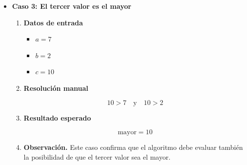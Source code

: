 \documentclass[12pt,twoside]{book}
\begin{document}
\begin{itemize}
\begin{enumerate}
								\item \textbf{Resolución manual}
								
								\[
								9 > 4 \quad \text{y} \quad 9 > 6
								\]
								
								\item \textbf{Resultado esperado}
								
								\[
								\text{mayor} = 9
								\]
								
								\item \textbf{Observación.}  
								Permite comprobar que el algoritmo puede identificar correctamente cuando el segundo valor es el mayor de los tres.
								
							\end{enumerate}
							
							
							\item \textbf{Caso 3: El tercer valor es el mayor}
							
							\begin{enumerate}
								
								\item \textbf{Datos de entrada}
								
								\begin{itemize}
									\item $a = 7$
									\item $b = 2$
									\item $c = 10$
								\end{itemize}
								
								\item \textbf{Resolución manual}
								
								\[
								10 > 7 \quad \text{y} \quad 10 > 2
								\]
								
								\item \textbf{Resultado esperado}
								
								\[
								\text{mayor} = 10
								\]
								
								\item \textbf{Observación.}  
								Este caso confirma que el algoritmo debe evaluar también la posibilidad de que el tercer valor sea el mayor.
								
							\end{enumerate}
							
							

\end{itemize}
\end{document}
